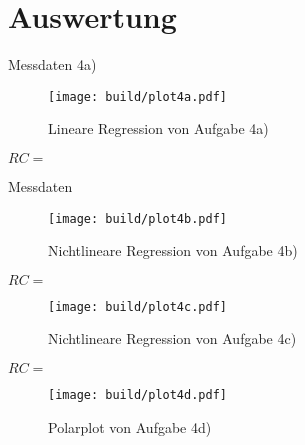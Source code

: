 \section{Auswertung}


  \begin{table}[H]
        \centering
        \caption{Messdaten 4a)}
         
        \label{tab:data4a}
  \end{table}
  
  \begin{figure}[H]
    \texttt{[image: build/plot4a.pdf]}
    \centering
    \caption{Lineare Regression von Aufgabe 4a)}
    \label{fig:4a}
  \end{figure}

  $RC=$


  \begin{table}
        \centering
        \caption{Messdaten}
         
        \label{tab:data}
  \end{table}

  \begin{figure}[H]
    \texttt{[image: build/plot4b.pdf]}
    \centering
    \caption{Nichtlineare Regression von Aufgabe 4b)}
    \label{fig:4b}
  \end{figure}

  $RC=$


  \begin{figure}[H]
    \texttt{[image: build/plot4c.pdf]}
    \centering
    \caption{Nichtlineare Regression von Aufgabe 4c)}
    \label{fig:4c}
  \end{figure}

  $RC=$


  \begin{figure}[H]
    \texttt{[image: build/plot4d.pdf]}
    \centering
    \caption{Polarplot von Aufgabe 4d)}
    \label{fig:4d}
  \end{figure}

